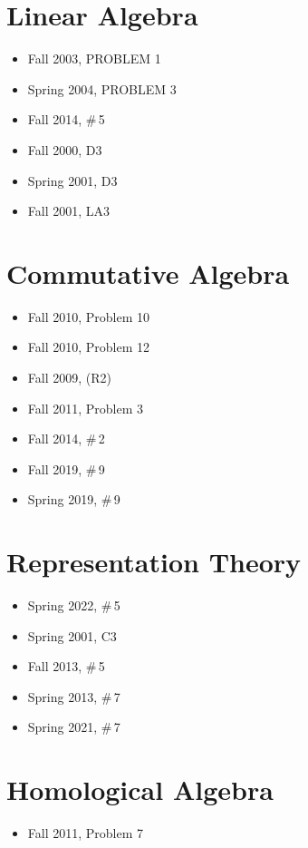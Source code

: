 \documentclass[11pt,letterpaper]{book}
\begin{document}
\section*{Linear Algebra}
\begin{itemize}
  \item Fall 2003, PROBLEM 1
  \item Spring 2004, PROBLEM 3
  \item Fall 2014, \#\,5
  \item Fall 2000, D3
  \item Spring 2001, D3
  \item Fall 2001, LA3
\end{itemize}

\section*{Commutative Algebra}
\begin{itemize}
  \item Fall 2010, Problem 10
  \item Fall 2010, Problem 12
  \item Fall 2009, (R2)
  \item Fall 2011, Problem 3
  \item Fall 2014, \#\,2
  \item Fall 2019, \#\,9
  \item Spring 2019, \#\,9
\end{itemize}

\section*{Representation Theory}
\begin{itemize}
  \item Spring 2022, \#\,5
  \item Spring 2001, C3
  \item Fall 2013, \#\,5
  \item Spring 2013, \#\,7
  \item Spring 2021, \#\,7
\end{itemize}

\section*{Homological Algebra}
\begin{itemize}
  \item Fall 2011, Problem 7
\end{itemize}

\printindex
\end{document}
